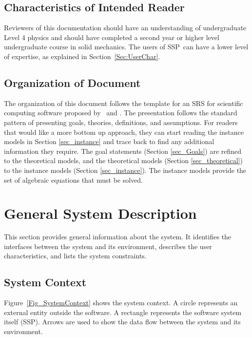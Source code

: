 \documentclass[12pt]{article}
\newcommand{\progname}{SSP}
\begin{document}
\subsection{Characteristics of Intended Reader}
\label{Sec:CharofInteRead}
Reviewers of this documentation should have an understanding of undergraduate 
Level 4 physics and should have completed a second year or higher level 
undergraduate course in solid mechanics. The users of \progname\ can have a 
lower level of expertise, as explained in Section~\ref{Sec:UserChar}.

\subsection{Organization of Document}

The organization of this document follows the template for an SRS for
scientific computing software proposed by~\cite{Koothoor2013} and
\cite{SmithAndLai2005}.  The presentation follows the standard pattern
of presenting goals, theories, definitions, and assumptions.  For
readers that would like a more bottom up approach, they can start
reading the instance models in Section \ref{sec_instance} and trace
back to find any additional information they require. The goal statements 
(Section \ref{sec_Goals}) are refined to the theoretical models, and the 
theoretical models (Section \ref{sec_theoretical}) to the instance models 
(Section \ref{sec_instance}). The instance models provide the set of algebraic 
equations that must be solved.


\section{General System Description}

This section provides general information about the system. It identifies the 
interfaces between the system and its environment, describes the user 
characteristics, and lists the system constraints.

\subsection{System Context}

Figure~\ref{Fig_SystemContext} shows the system context.  A circle represents an
external entity outside the software.  A rectangle represents the software 
system itself (\progname).  Arrows are used to show the data flow between the 
system and its environment.
\end{document}
